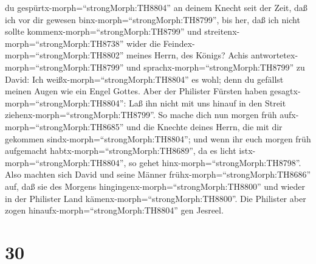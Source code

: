 du gespürtx-morph=``strongMorph:TH8804'' an deinem Knecht seit der Zeit,
daß ich vor dir gewesen binx-morph=``strongMorph:TH8799'', bis her, daß
ich nicht sollte kommenx-morph=``strongMorph:TH8799'' und
streitenx-morph=``strongMorph:TH8738'' wider die
Feindex-morph=``strongMorph:TH8802'' meines Herrn, des Königs?
 Achis antwortetex-morph=``strongMorph:TH8799'' und
sprachx-morph=``strongMorph:TH8799'' zu David: Ich
weißx-morph=``strongMorph:TH8804'' es wohl; denn du gefällst meinen
Augen wie ein Engel Gottes. Aber der Philister Fürsten haben
gesagtx-morph=``strongMorph:TH8804'': Laß ihn nicht mit uns hinauf in
den Streit ziehenx-morph=``strongMorph:TH8799''.  So mache
dich nun morgen früh aufx-morph=``strongMorph:TH8685'' und die Knechte
deines Herrn, die mit dir gekommen sindx-morph=``strongMorph:TH8804'';
und wenn ihr euch morgen früh aufgemacht
habtx-morph=``strongMorph:TH8689'', da es licht
istx-morph=``strongMorph:TH8804'', so gehet
hinx-morph=``strongMorph:TH8798''.  Also machten sich David
und seine Männer frühx-morph=``strongMorph:TH8686'' auf, daß sie des
Morgens hingingenx-morph=``strongMorph:TH8800'' und wieder in der
Philister Land kämenx-morph=``strongMorph:TH8800''. Die Philister aber
zogen hinaufx-morph=``strongMorph:TH8804'' gen Jesreel.

\hypertarget{section-29}{%
\section{30}\label{section-29}}

